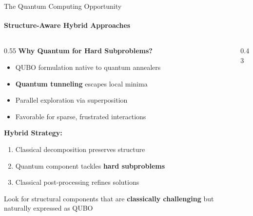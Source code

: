 \documentclass[aspectratio=169,10pt]{beamer}
\begin{document}
\begin{frame}{The Quantum Computing Opportunity}
    \framesubtitle{Structure-Aware Hybrid Approaches}
    
    \begin{columns}[T]
        \begin{column}{0.55\textwidth}
            \textbf{Why Quantum for Hard Subproblems?}
            \begin{itemize}\footnotesize
                \item QUBO formulation native to quantum annealers
                \item \textbf{Quantum tunneling} escapes local minima
                \item Parallel exploration via superposition
                \item Favorable for sparse, frustrated interactions
            \end{itemize}
            
            \vspace{0.3cm}
            \textbf{Hybrid Strategy:}
            \begin{enumerate}\scriptsize
                \item Classical decomposition preserves structure
                \item Quantum component tackles \textbf{hard subproblems}
                \item Classical post-processing refines solutions
            \end{enumerate}
            
            \vspace{0.2cm}
            \begin{keyinsight}
                \scriptsize Look for structural components that are \textbf{classically challenging} but naturally expressed as QUBO
            \end{keyinsight}
        \end{column}
        
        \begin{column}{0.43\textwidth}
            \vspace{0.2cm}
\end{column}
\end{columns}
\end{frame}
\end{document}
